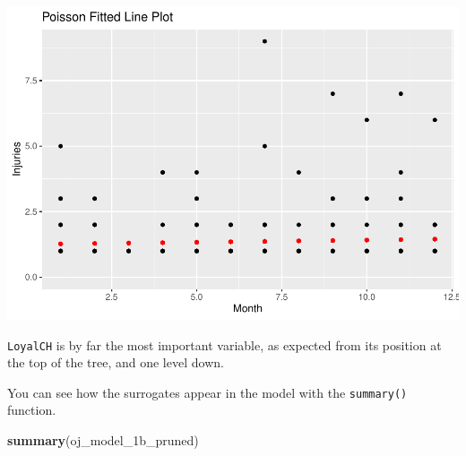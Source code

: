 \documentclass[
]{book}
\newenvironment{Shaded}{\begin{snugshade}}{\end{snugshade}}
\newcommand{\KeywordTok}[1]{\textcolor[rgb]{0.13,0.29,0.53}{\textbf{#1}}}
\newcommand{\NormalTok}[1]{#1}
\begin{document}
\includegraphics{data-sci_files/figure-latex/unnamed-chunk-38-1.pdf}

\texttt{LoyalCH} is by far the most important variable, as expected from its position at the top of the tree, and one level down.

You can see how the surrogates appear in the model with the \texttt{summary()} function.

\begin{Shaded}
\begin{Highlighting}[]
\KeywordTok{summary}\NormalTok{(oj_model_1b_pruned)}
\end{Highlighting}
\end{Shaded}
\end{document}
